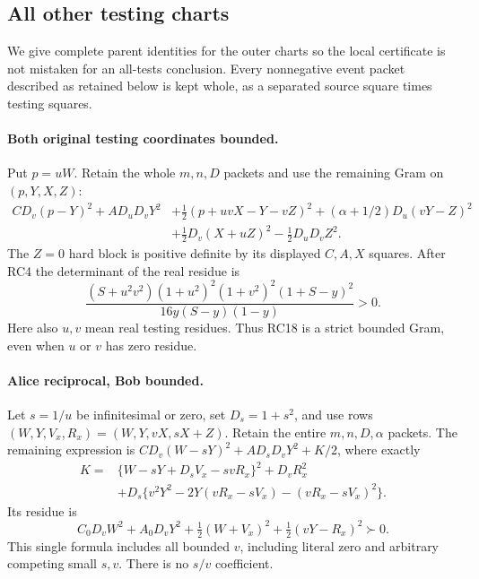 \subsection{All other testing charts}

We give complete parent identities for the outer charts so the
local certificate is not mistaken for an all-tests conclusion.
Every nonnegative event packet described as retained below is
kept whole, as a separated source square times testing squares.

\paragraph{Both original testing coordinates bounded.}
Put $p=uW$. Retain the whole $m,n,D$ packets and use the
remaining Gram on $(p,Y,X,Z)$:
\[
\begin{split}
 C D_v(p-Y)^2+A D_uD_vY^2
 &+\tfrac12(p+uvX-Y-vZ)^2+(\alpha+1/2)D_u(vY-Z)^2\\
 &+\tfrac12D_v(X+uZ)^2-\tfrac12D_uD_vZ^2.
\end{split}\tag{RC18}
\]
The $Z=0$ hard block is positive definite by its displayed
$C,A,X$ squares. After RC4 the determinant of the real residue is
\[
 \frac{(S+u^2v^2)(1+u^2)^2(1+v^2)^2(1+S-y)^2}
      {16y(S-y)(1-y)}>0.
 \tag{RC19}
\]
Here also $u,v$ mean real testing residues. Thus RC18 is a strict
bounded Gram, even when $u$ or $v$ has zero residue.

\paragraph{Alice reciprocal, Bob bounded.}
Let $s=1/u$ be infinitesimal or zero, set $D_s=1+s^2$, and use
rows $(W,Y,V_x,R_x)=(W,Y,vX,sX+Z)$. Retain the entire
$m,n,D,\alpha$ packets. The remaining expression is
$CD_v(W-sY)^2+AD_sD_vY^2+K/2$, where exactly
\[
\begin{split}
 K={}&\{W-sY+D_sV_x-svR_x\}^2+D_vR_x^2\\
 &+D_s\{v^2Y^2-2Y(vR_x-sV_x)-(vR_x-sV_x)^2\}.
\end{split}\tag{RC20}
\]
Its residue is
\[
 C_0D_vW^2+A_0D_vY^2
          +\tfrac12(W+V_x)^2+\tfrac12(vY-R_x)^2\succ0.
 \tag{RC21}
\]
This single formula includes all bounded $v$, including literal
zero and arbitrary competing small $s,v$. There is no $s/v$
coefficient.

